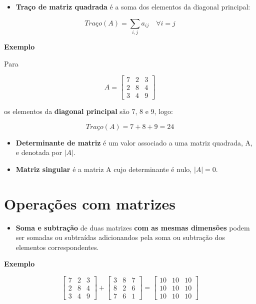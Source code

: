 \documentclass[
]{book}
\providecommand{\tightlist}{%
  \setlength{\itemsep}{0pt}\setlength{\parskip}{0pt}}
\begin{document}
\begin{itemize}
\tightlist
\item
  \textbf{Traço de matriz quadrada} é a soma dos elementos da diagonal principal:
\end{itemize}

\begin{equation*}
Traço(A)= \sum_{i,j} a_{ij} \quad \forall i = j
\end{equation*}

\textbf{Exemplo}

Para

\begin{equation*}
A = 
\begin{bmatrix}
7 & 2 & 3\\
2 & 8 & 4\\
3 & 4 & 9
\end{bmatrix}
\end{equation*}

os elementos da \textbf{diagonal principal} são 7, 8 e 9, logo:

\begin{equation*}
Traço(A)= 7 + 8 + 9 = 24
\end{equation*}

\begin{itemize}
\item
  \textbf{Determinante de matriz} é um valor associado a uma matriz quadrada, A, e denotada por \(|A|\).
\item
  \textbf{Matriz singular} é a matriz A cujo determinante é nulo, \(|A| = 0\).
\end{itemize}

\hypertarget{operauxe7uxf5es-com-matrizes}{%
\section{Operações com matrizes}\label{operauxe7uxf5es-com-matrizes}}

\begin{itemize}
\tightlist
\item
  \textbf{Soma e subtração} de duas matrizes \textbf{com as mesmas dimensões} podem ser somadas ou subtraídas adicionandos pela soma ou subtração dos elementos correspondentes.
\end{itemize}

\textbf{Exemplo}

\begin{equation*}
\begin{bmatrix}
7 & 2 & 3\\
2 & 8 & 4\\
3 & 4 & 9
\end{bmatrix} + 
\begin{bmatrix}
3 & 8 & 7\\
8 & 2 & 6\\
7 & 6 & 1
\end{bmatrix} = 
\begin{bmatrix}
10 & 10 & 10\\
10 & 10 & 10\\
10 & 10 & 10
\end{bmatrix}
\end{equation*}
\end{document}
